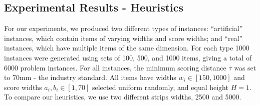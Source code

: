 \documentclass{elsarticle}
\begin{document}
\subsection{Experimental Results - Heuristics}
\label{sub:expheuristics}
\noindent For our experiments, we produced two different types of instances: ``artificial'' instances, which contain items of varying widths and score widths; and ``real'' instances, which have multiple items of the same dimension. For each type 1000 instances were generated using sets of 100, 500, and 1000 items, giving a total of 6000 problem instances. For all instances, the minimum scoring distance $\tau$ was set to 70mm - the industry standard. All items have widths $w_i \in [150,1000]$ and score widths $a_i, b_i \in [1,70]$ selected uniform randomly, and equal height $H=1$. To compare our heuristics, we use two different strips widths, 2500 and 5000.
\end{document}
